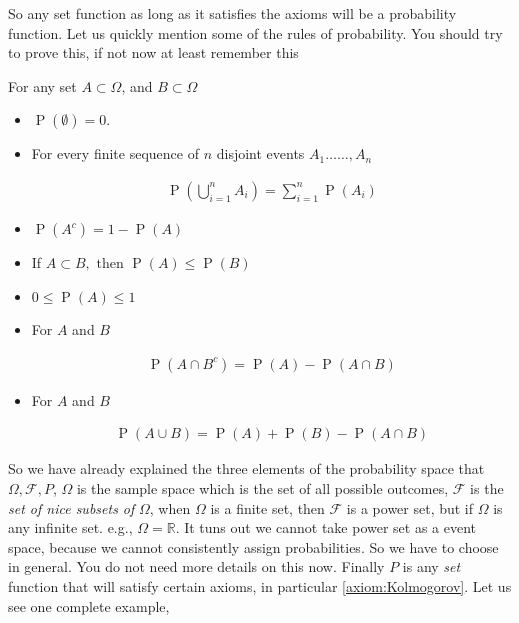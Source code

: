 \documentclass[ 11pt,%
				a4paper,%
				oneside,%
				headinclude,%
				footinclude = true,%
				cleardoublepage = empty,%
				reqno]{scrbook}
\begin{document}
			So any set function as long as it satisfies the axioms will be a probability function. Let us quickly mention some of the rules of probability. You should try to prove this, if not now at least remember this

			\begin{theorem}
				For any set $A\subset\Omega$, and $B \subset \Omega$

				\begin{itemize}

					\item $\operatorname{P}(\emptyset)=0$.
					\item For every finite sequence of $n$ disjoint events $A_{1} \ldots \ldots, A_{n}$

						\begin{align*}
							\operatorname{P}\left(\bigcup_{i=1}^{n} A_{i}\right)=\sum_{i=1}^{n} \operatorname{P}\left(A_{i}\right)
						\end{align*}

					\item $\operatorname{P}\left(A^{c}\right)=1-\operatorname{P}(A)$

					\item  If $A \subset B, \text { then } \operatorname{P}(A) \leq \operatorname{P}(B)$

					\item  $0 \leq \operatorname{P}(A) \leq 1$

					\item For $A$ and $B$

						\begin{align*}
							\operatorname{P}\left(A \cap B^{c}\right)=\operatorname{P}(A)-\operatorname{P}(A \cap B)
						\end{align*}
						

					\item For $A$ and $B$
						
						\begin{align*}
								\operatorname{P}(A \cup B)=\operatorname{P}(A)+\operatorname{P}(B)-\operatorname{P}(A \cap B)
						\end{align*}
					
					
						
						
				\end{itemize}
			\end{theorem}


	So we have already explained the three elements of the probability space that $\Omega, \mathcal{F}, P$, $\Omega$ is the sample space which is the set of all possible outcomes, $\mathcal{F}$ is the \emph{set of nice subsets of} $\Omega$, when $\Omega$ is a finite set, then $\mathcal{F}$ is a power set, but if  $\Omega$ is any infinite set. e.g., $\Omega = \mathbb{R}$. It tuns out we cannot take power set as a event space, because we cannot consistently assign probabilities. So we have to choose in general. You do not need more details on this now. Finally $P$ is any \emph{set} function that will satisfy certain axioms, in particular \cref{axiom:Kolmogorov}. Let us see one complete example,
\end{document}
